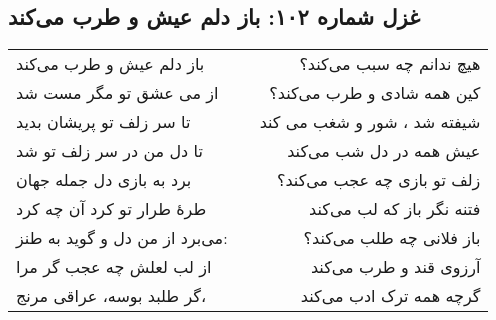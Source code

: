 \begin{center}
\section*{غزل شماره ۱۰۲: باز دلم عیش و طرب می‌کند}
\label{sec:102}
\begin{longtable}{l p{0.5cm} r}
باز دلم عیش و طرب می‌کند
&&
هیچ ندانم چه سبب می‌کند؟
\\
از می عشق تو مگر مست شد
&&
کین همه شادی و طرب می‌کند؟
\\
تا سر زلف تو پریشان بدید
&&
شیفته شد ، شور و شغب می کند
\\
تا دل من در سر زلف تو شد
&&
عیش همه در دل شب می‌کند
\\
برد به بازی دل جمله جهان
&&
زلف تو بازی چه عجب می‌کند؟
\\
طرهٔ طرار تو کرد آن چه کرد
&&
فتنه نگر باز که لب می‌کند
\\
می‌برد از من دل و گوید به طنز:
&&
باز فلانی چه طلب می‌کند؟
\\
از لب لعلش چه عجب گر مرا
&&
آرزوی قند و طرب می‌کند
\\
گر طلبد بوسه، عراقی مرنج،
&&
گرچه همه ترک ادب می‌کند
\\
\end{longtable}
\end{center}
